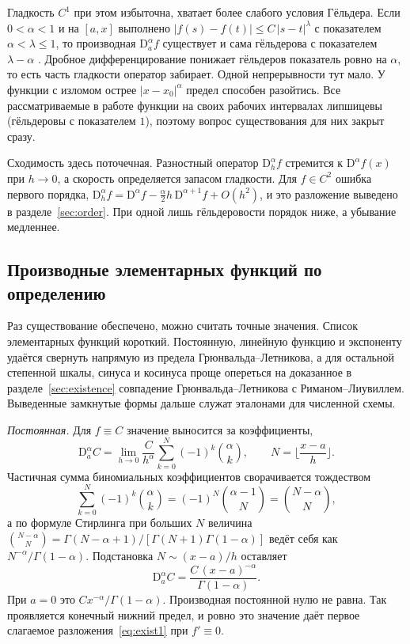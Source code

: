 \documentclass[14pt,a4paper]{extarticle}
\newcommand{\D}{\mathrm{D}}
\begin{document}
Гладкость $C^1$ при этом избыточна, хватает более слабого условия Гёльдера. Если $0<\alpha<1$ и на $[a,x]$ выполнено $|f(s)-f(t)|\le C\,|s-t|^{\lambda}$ с показателем $\alpha<\lambda\le1$, то производная $\D^{\alpha}_{a}f$ существует и сама гёльдерова с показателем $\lambda-\alpha$ \cite{samko}. Дробное дифференцирование понижает гёльдеров показатель ровно на $\alpha$, то есть часть гладкости оператор забирает. Одной непрерывности тут мало. У функции с изломом острее $|x-x_0|^{\alpha}$ предел способен разойтись. Все рассматриваемые в работе функции на своих рабочих интервалах липшицевы (гёльдеровы с показателем $1$), поэтому вопрос существования для них закрыт сразу.

Сходимость здесь поточечная. Разностный оператор $\D^{\alpha}_{h}f$ стремится к $\D^{\alpha}f(x)$ при $h\to0$, а скорость определяется запасом гладкости. Для $f\in C^2$ ошибка первого порядка, $\D^{\alpha}_{h}f=\D^{\alpha}f-\tfrac{\alpha}{2}h\,\D^{\alpha+1}f+O(h^2)$, и это разложение выведено в разделе~\ref{sec:order}. При одной лишь гёльдеровости порядок ниже, а убывание медленнее.

\subsection{Производные элементарных функций по определению}
\label{sec:byhand}

Раз существование обеспечено, можно считать точные значения. Список элементарных функций короткий. Постоянную, линейную функцию и экспоненту удаётся свернуть напрямую из предела Грюнвальда--Летникова, а для остальной степенной шкалы, синуса и косинуса проще опереться на доказанное в разделе~\ref{sec:existence} совпадение Грюнвальда--Летникова с Риманом--Лиувиллем. Выведенные замкнутые формы дальше служат эталонами для численной схемы.

\textit{Постоянная.} Для $f\equiv C$ значение выносится за коэффициенты,
\[
\D^{\alpha}_{a}C=\lim_{h\to0}\frac{C}{h^{\alpha}}\sum_{k=0}^{N}(-1)^k\binom{\alpha}{k},\qquad N=\Big\lfloor\frac{x-a}{h}\Big\rfloor.
\]
Частичная сумма биномиальных коэффициентов сворачивается тождеством
\[
\sum_{k=0}^{N}(-1)^k\binom{\alpha}{k}=(-1)^N\binom{\alpha-1}{N}=\binom{N-\alpha}{N},
\]
а по формуле Стирлинга при больших $N$ величина $\binom{N-\alpha}{N}=\Gamma(N-\alpha+1)/[\Gamma(N+1)\Gamma(1-\alpha)]$ ведёт себя как $N^{-\alpha}/\Gamma(1-\alpha)$. Подстановка $N\sim(x-a)/h$ оставляет
\begin{equation}
\D^{\alpha}_{a}C=\frac{C\,(x-a)^{-\alpha}}{\Gamma(1-\alpha)}.
\label{eq:dconst}
\end{equation}
При $a=0$ это $C x^{-\alpha}/\Gamma(1-\alpha)$. Производная постоянной нулю не равна. Так проявляется конечный нижний предел, и ровно это значение даёт первое слагаемое разложения~\eqref{eq:exist1} при $f'\equiv0$.
\end{document}
